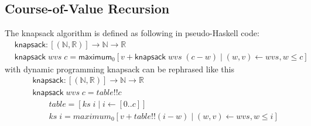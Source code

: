 \documentclass{article}
\newcommand{\N}{\mathbb{N}}
\newcommand{\Nat}{\N}
\newcommand{\R}{\mathbb{R}}
\newcommand{\operator}[1]{\textsf{#1}}
\begin{document}
\subsection{Course-of-Value Recursion}
The knapsack algorithm is defined as following in pseudo-Haskell code:
\begin{align*}
  & \operator{knapsack} : [(\Nat, \R)] \to \Nat \to \R\\
  & \operator{knapsack}\;wvs\; c = \operator{maximum}_{0}
    [v + \operator{knapsack}\;wvs\; (c - w) \mid (w,v) \leftarrow wvs, w \le c]
\end{align*}
%
with dynamic programming knapsack can be rephrased like this
\begin{align*}
  & \operator{knapsack} : [(\Nat, \R)] \to \Nat \to \R\\
  & \operator{knapsack}\;wvs\;c= table !! c \\
  & \qquad table  = [ks\;i \mid i \leftarrow [0..c]]\\
  & \qquad ks\; i = maximum_{0} [v + table!! (i - w) \mid (w,v) \leftarrow wvs, w \le i]
\end{align*}
\end{document}
